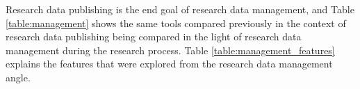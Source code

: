 \clearpage

Research data publishing is the end goal of research data management, and
Table \ref{table:management} shows the same tools compared previously in
the context of research data publishing being compared in the light
of research data management during the research process. Table
\ref{table:management_features} explains the features that were
explored from the research data management angle.

